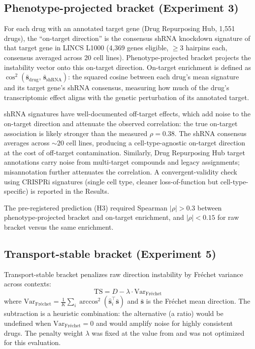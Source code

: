 \documentclass[11pt]{article}
\begin{document}
\subsection{Phenotype-projected bracket (Experiment 3)}

For each drug with an annotated target gene (Drug Repurposing Hub,
1{,}551 drugs), the ``on-target direction'' is the consensus shRNA
knockdown signature of that target gene in LINCS L1000 (4{,}369 genes
eligible, $\geq$3 hairpins each, consensus averaged across 20 cell lines).
Phenotype-projected bracket projects the instability vector onto this
on-target direction. On-target enrichment is defined as $\cos^2(\bar{\mathbf{s}}_{\text{drug}},\,
\bar{\mathbf{s}}_{\text{shRNA}})$: the squared cosine between each drug's
mean signature and its target gene's shRNA consensus, measuring how much
of the drug's transcriptomic effect aligns with the genetic perturbation of
its annotated target.

shRNA signatures have well-documented off-target effects, which add noise
to the on-target direction and attenuate the observed correlation: the true
on-target association is likely stronger than the measured $\rho = 0.38$.
The shRNA consensus averages across ${\sim}20$ cell lines, producing a
cell-type-agnostic on-target direction at the cost of off-target
contamination. Similarly, Drug Repurposing Hub target annotations carry
noise from multi-target compounds and legacy assignments; misannotation
further attenuates the correlation. A convergent-validity
check using CRISPRi signatures (single cell type, cleaner
loss-of-function but cell-type-specific) is reported in the Results.

The pre-registered prediction (H3) required Spearman $|\rho| > 0.3$ between
phenotype-projected bracket and on-target enrichment, and $|\rho| < 0.15$
for raw bracket versus the same enrichment.

\subsection{Transport-stable bracket (Experiment 5)}

Transport-stable bracket penalizes raw direction instability by Fr\'{e}chet
variance across contexts:
\begin{equation}
  \text{TS} = D - \lambda \cdot \text{Var}_{\text{Fr\'echet}}
  \label{eq:ts}
\end{equation}
where $\text{Var}_{\text{Fr\'echet}} = \frac{1}{K}\sum_i
\arccos^2(\hat{\mathbf{s}}_i^\top \bar{\mathbf{s}})$ and
$\bar{\mathbf{s}}$ is the Fr\'echet mean direction. The subtraction is a
heuristic combination: the alternative (a ratio) would be undefined when
$\text{Var}_{\text{Fr\'echet}} = 0$ and would amplify noise for highly
consistent drugs. The penalty weight $\lambda$ was fixed at the value from
\citet{tower2026drug} and was not optimized for this evaluation.
\end{document}
